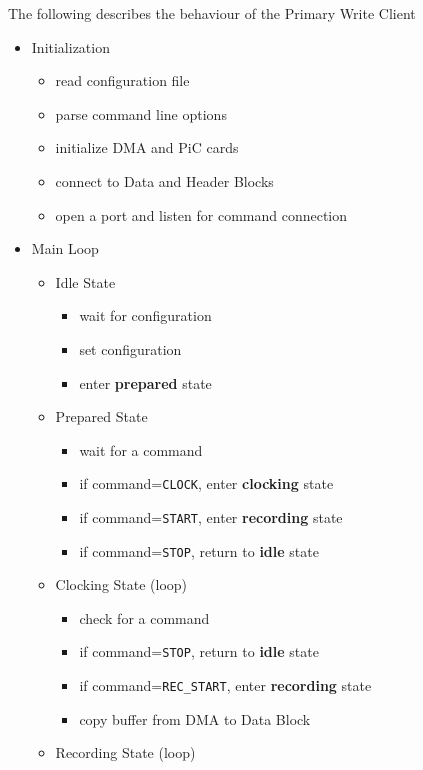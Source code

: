 The following describes the behaviour of the Primary Write Client

\begin{itemize}
\item Initialization
\vspace{-3mm}
	\begin{itemize}
	\item read configuration file
	\item parse command line options
	\item initialize DMA and PiC cards
	\item connect to Data and Header Blocks
	\item open a port and listen for command connection
	\end{itemize}
\item Main Loop
\vspace{-3mm}
	\begin{itemize}
	\item Idle State
	\vspace{-2mm}
		\begin{itemize}
		\item wait for configuration
		\item set configuration
		\item enter {\bf prepared} state
		\end{itemize}
	\item Prepared State
	\vspace{-2mm}
		\begin{itemize}
		\item wait for a command
		\item if command={\tt CLOCK}, enter {\bf clocking} state
		\item if command={\tt START}, enter {\bf recording} state
		\item if command={\tt STOP}, return to {\bf idle} state
		\end{itemize}
	\item Clocking State (loop)
	\vspace{-2mm}
		\begin{itemize}
		\item check for a command
		\item if command={\tt STOP}, return to {\bf idle} state
		\item if command={\tt REC\_START}, enter {\bf recording} state
		\item copy buffer from DMA to Data Block
		\end{itemize}
	\item Recording State (loop)

\end{itemize}
\end{itemize}
